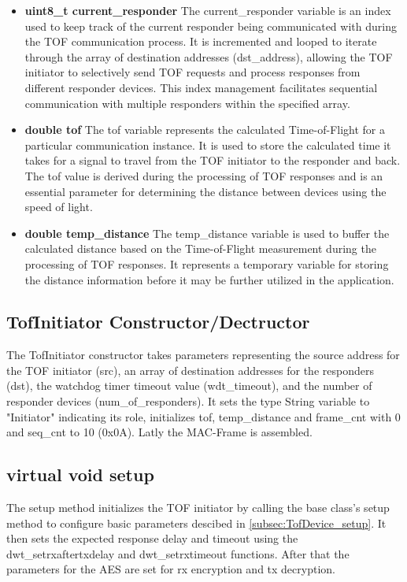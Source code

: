 \begin{itemize}
	\item \textbf{uint8\_t current\_responder}
	\newline
	The current\_responder variable is an index used to keep track of the current responder being communicated with during the TOF communication process. 
	It is incremented and looped to iterate through the array of destination addresses (dst\_address), allowing the TOF initiator to selectively send TOF requests and process responses from different responder devices. 
	This index management facilitates sequential communication with multiple responders within the specified array.
	
	\item \textbf{double tof}
	\newline
	The tof variable represents the calculated Time-of-Flight for a particular communication instance. 
	It is used to store the calculated time it takes for a signal to travel from the TOF initiator to the responder and back. 
	The tof value is derived during the processing of TOF responses and is an essential parameter for determining the distance between devices using the speed of light.
	
	\item \textbf{double temp\_distance}
	\newline
	The temp\_distance variable is used to buffer the calculated distance based on the Time-of-Flight measurement during the processing of TOF responses. 
	It represents a temporary variable for storing the distance information before it may be further utilized in the application. 
\end{itemize}

\subsection{TofInitiator Constructor/Dectructor}
\label{subsec:TofInitiator_Constructor}
The TofInitiator constructor takes parameters representing the source address for the TOF initiator (src), an array of destination addresses for the responders (dst), the watchdog timer timeout value (wdt\_timeout), and the number of responder devices (num\_of\_responders). 
It sets the type String variable to "Initiator" indicating its role, initializes tof, temp\_distance and frame\_cnt with 0 and seq\_cnt to 10 (0x0A). 
Latly the MAC-Frame is assembled. 

\subsection{virtual void setup}
\label{subsec:TofInitiator_setup}
The setup method initializes the TOF initiator by calling the base class's setup method to configure basic parameters descibed in \ref{subsec:TofDevice_setup}. 
It then sets the expected response delay and timeout using the dwt\_setrxaftertxdelay and dwt\_setrxtimeout functions. 
After that the parameters for the AES are set for rx encryption and tx decryption. 

